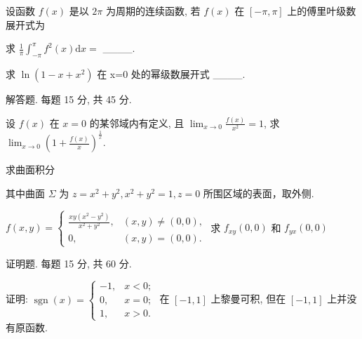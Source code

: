 \par{}
设函数 $f(x)$ 是以 $2\pi$ 为周期的连续函数, 若 $f(x)$ 在 $[-\pi, \pi]$ 上的傅里叶级数展开式为\par
\nopagebreak[4]
求  $\frac{1}{\pi}\int_{-\pi}^{\pi}f^{2}(x)\mathrm{d}x=$  \_\_\_\_.\par
求  $\ln(1-x+x^{2})$  在 x=0 处的幂级数展开式 \_\_\_\_.\par
\par{}
解答题. 每题 15 分, 共 45 分.\par
设 $f(x)$ 在 $x = 0$ 的某邻域内有定义, 且 $\lim_{x \to 0} \frac{f(x)}{x^2} = 1$, 求 $\lim_{x \to 0} \left(1 + \frac{f(x)}{x}\right)^{\frac{1}{x}}$.\par
\par{}
求曲面积分\par
\nopagebreak[4]
其中曲面 $\Sigma$ 为 $z = x^{2} + y^{2}, x^{2} + y^{2} = 1, z = 0$ 所围区域的表面，取外侧.\par
$f(x,y) = \left\{ \begin{array}{ll}\frac{xy(x^2 - y^2)}{x^2 + y^2}, & (x,y)\neq (0,0),\\ 0, & (x,y) = (0,0). \end{array} \right.$ 求 $f_{xy}(0,0)$ 和 $f_{yx}(0,0)$\par
\par{}
证明题. 每题 15 分, 共 60 分.\par
证明: $\operatorname{sgn}(x)=\begin{cases}-1,&x<0;\\0,&x=0;\\1,&x>0.\end{cases}$ 在 $[-1,1]$ 上黎曼可积, 但在 $[-1,1]$ 上并没有原函数.\par
